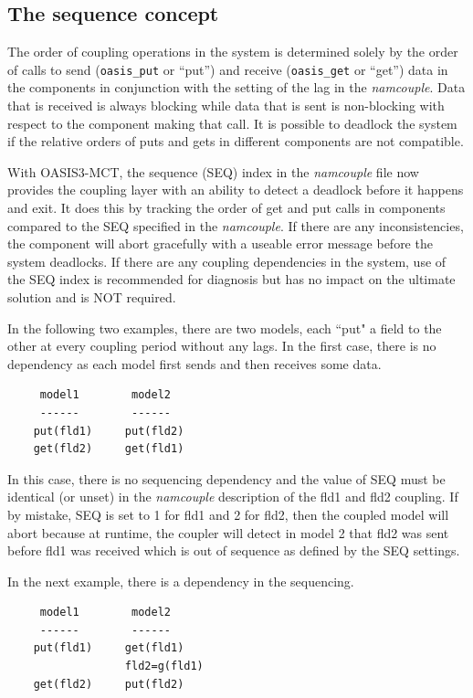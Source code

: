 \vspace{-0.3cm}
\subsection{The sequence concept}
\label{subsec_sec}

The order of coupling operations in the system is determined solely by
the order of calls to send ({\tt oasis\_put} or ``put'') and receive ({\tt oasis\_get} or ``get'') data in the components
in conjunction with the setting of the lag in the {\it namcouple}.
Data that is received is always blocking while data that is sent is non-blocking with respect to the component making that call.  It
is possible to deadlock the system if the relative orders of puts and
gets in different components are not compatible.

With OASIS3-MCT, the sequence (SEQ) index in the {\it namcouple} file
now provides the coupling layer with an ability to detect a deadlock
before it happens and exit.  It does this by tracking the order of get
and put calls in components compared to the SEQ specified in the {\it
  namcouple}.  If there are any inconsistencies, the component will abort
gracefully with a useable error message before the system deadlocks.
If there are any coupling dependencies in the system, use of the SEQ
index is recommended for diagnosis but has no impact on the ultimate
solution and is NOT required.

In the following two examples, there are two
models, each ``put" a field to the other at every coupling period
without any lags.  In the first case, there is no dependency as each
model first sends and then receives some data.

\begin{verbatim}
     model1        model2
     ------        ------
    put(fld1)     put(fld2)
    get(fld2)     get(fld1)
\end{verbatim}

In this
case, there is no sequencing dependency and the value of SEQ must be
identical (or unset) in the {\it namcouple} description of the fld1
and fld2 coupling.  If by mistake, SEQ is set to 1 for fld1 and 2 for fld2, 
then the coupled model will abort because at runtime, the coupler will
detect in model 2 that fld2 was sent before fld1 was received which
is out of sequence as defined by the SEQ settings.

In the next example, there is a dependency in the sequencing.

\begin{verbatim}
     model1        model2
     ------        ------
    put(fld1)     get(fld1)
                  fld2=g(fld1)
    get(fld2)     put(fld2)
\end{verbatim}

